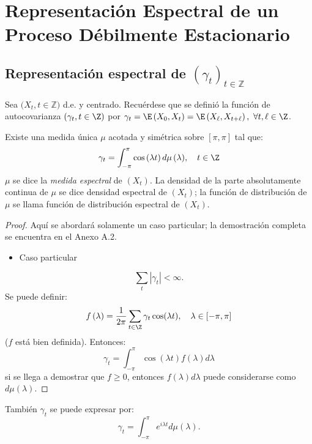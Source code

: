 \section{Representaci\'{o}n Espectral de un Proceso D\'{e}bilmente Estacionario}
\subsection{Representaci\'{o}n espectral de $(\gamma_{t})_{t\in \mathbb{Z}}$ }

Sea $(X_{t}, t\in \mathbb{Z)}$ d.e. y centrado. Recu\'{e}rdese que se defini\'{o} la funci\'{o}n de autocovarianza $\left( \gamma_{t}, t\in \Z \right)$ por $\gamma_{t}=\E\left( X_{0},X_{t} \right)=\E\left( X_{\ell}, X_{t+\ell} \right),\ \forall t, \ell\in \Z$. 

\begin{teorema}
Existe una medida \'{u}nica $\mu$ acotada y sim\'{e}trica sobre $\left[ \pi , \pi \right]$ tal que:
\[
\gamma_{t}=\int_{-\pi }^\pi {\cos \left( \lambda t \right)d\mu 
\left( \lambda \right)},\quad t\in \Z
\]
$\mu $ se dice la \emph{medida espectral} de $\left( X_{t} \right)$. La densidad de la parte 
absolutamente continua de $\mu $ se dice densidad espectral de $\left( X_{t} \right)$; la funci\'{o}n de distribuci\'{o}n de $\mu $ se llama funci\'{o}n de distribuci\'{o}n espectral de $\left( X_{t} \right)$.
 
\end{teorema}

\begin{proof}
Aqu\'{i} se abordar\'{a} solamente un caso particular; la demostraci\'{o}n completa se encuentra en el Anexo A.2.
\begin{itemize}
      \item Caso particular
\end{itemize}

\[
\sum_t \left| \gamma_{t} \right| <\infty .
\]
Se puede definir:
\[
f\left( \lambda \right)=\frac{1}{2\pi }\sum_{t\in \Z} {\gamma 
_{t}\cos(\lambda t)} ,\quad \lambda \in 
\left[ -\pi ,\pi \right]
\]
($f$ est\'{a} bien definida). Entonces: 
\[
\gamma_{t}=\int_{-\pi }^\pi {\cos \left( \lambda t \right)f(\lambda 
)d\lambda } 
\]
si se llega a demostrar que $f\ge 0$, entonces $f(\lambda )d\lambda $ puede considerarse como $d\mu (\lambda )$.
\end{proof}

\begin{observacion}
Tambi\'{e}n $\gamma_{t}$ se puede expresar por: 
\[
\gamma_{t}=\int_{-\pi }^\pi {e^{i\lambda t}d\mu \left( \lambda 
\right)} .
\]
\end{observacion}

